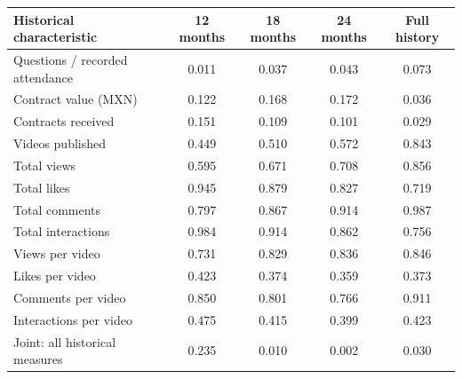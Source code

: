 \begingroup\small
\setlength{\tabcolsep}{3pt}
\renewcommand{\arraystretch}{1.25}
\noindent%
\begin{tabular*}{\linewidth}{@{\extracolsep{\fill}}lcccc@{}}
\toprule
Historical characteristic & 12 months & 18 months & 24 months & Full history \\
\midrule
Questions / recorded attendance & 0.011 & 0.037 & 0.043 & 0.073 \\
\addlinespace
Contract value (MXN) & 0.122 & 0.168 & 0.172 & 0.036 \\
Contracts received & 0.151 & 0.109 & 0.101 & 0.029 \\
\addlinespace
Videos published & 0.449 & 0.510 & 0.572 & 0.843 \\
Total views & 0.595 & 0.671 & 0.708 & 0.856 \\
Total likes & 0.945 & 0.879 & 0.827 & 0.719 \\
Total comments & 0.797 & 0.867 & 0.914 & 0.987 \\
Total interactions & 0.984 & 0.914 & 0.862 & 0.756 \\
Views per video & 0.731 & 0.829 & 0.836 & 0.846 \\
Likes per video & 0.423 & 0.374 & 0.359 & 0.373 \\
Comments per video & 0.850 & 0.801 & 0.766 & 0.911 \\
Interactions per video & 0.475 & 0.415 & 0.399 & 0.423 \\
\midrule
Joint: all historical measures & 0.235 & 0.010 & 0.002 & 0.030 \\
\bottomrule
\end{tabular*}\par\endgroup
